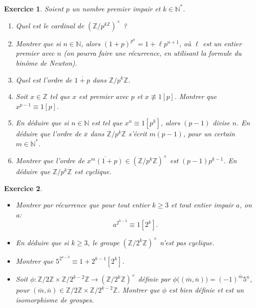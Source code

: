 \documentclass[11pt,a4paper]{article}
\newtheorem{ex}{Exercice}
\newcommand{\N}{\mathbb{N}}
\newcommand{\Z}{\mathbb{Z}}
\begin{document}
\
\begin{ex}\label{cyclicite_Z_pkZ}
Soient $p$ un nombre premier impair et $k\in \N^*$. 
\begin{enumerate}
\item Quel est le cardinal de $(\Z/p^{k\Z})^\times$ ?

\item Montrer que si $n\in \N$, alors $(1+p)^{p^n}=1+\ell p^{n+1}$, où $\ell$ est un entier premier avec $n$ (on pourra faire une récurrence, en utilisant la formule du binôme de Newton).

\item Quel est l'ordre de $\overline{1+p}$ dans $\Z/p^{k}\Z$.

\item Soit $x\in \Z$ tel que $x$ est premier avec $p$ et $x\not\equiv 1[p]$. Montrer que $x^{p-1}\equiv 1[p]$. 

\item En déduire que si $n\in \N$ est tel que $x^n\equiv 1[ p^k]$, alors $(p-1)$ divise $n$. En déduire que l'ordre de $\overline{x}$ dans $\Z/p^{k}\Z$ s'écrit $m(p-1)$, pour un certain $m\in  \N^*$.

\item Montrer que l'ordre de $\overline{x^m(1+p)}\in (\Z/p^k\Z)^\times$ est $(p-1)p^{k-1}$. En déduire que $\Z/p^k\Z$ est cyclique.
\end{enumerate}
\end{ex}


\begin{ex}\label{ordre_Z_2KZ}\
\begin{itemize}
\item[$1.$] Montrer par récurrence que pour tout entier $k \geq  3$ et tout entier impair $a$, on a:
$$  a^{2^{k-2}}\equiv 1 [2^k] .  $$
\item[$2.$] En déduire que si $k \geq  3$, le groupe $(\mathbb{Z}/2^k \mathbb{Z})^{\times}$ n'est pas cyclique.


\item[$3.$] Montrer que $5^{2^{k-3}}\equiv 1+2^{k-1}[2^k]$.

\item[$4.$] Soit $\phi:\Z/2\Z\times \Z/2^{k-2}\Z\rightarrow (\Z/2^k\Z)^\times$ définie par $\phi\big((\overline{m},\overline{n})\big)=(-1)^{\overline{m}} 5^{\overline{n}}$, pour $(\overline{m},\overline{n})\in \Z/2\Z\times \Z/2^{k-2}\Z$. Montrer que $\phi$ est bien définie et est un isomorphisme de groupes.

\end{itemize}
\end{ex}
\end{document}
